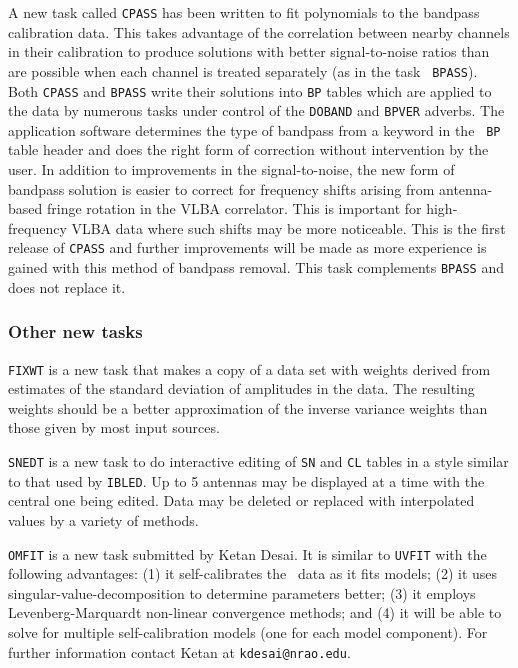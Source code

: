 A new task called {\tt CPASS} has been written to fit polynomials to
the bandpass calibration data.  This takes advantage of the
correlation between nearby channels in their calibration to produce
solutions with better signal-to-noise ratios than are possible when
each channel is treated separately (as in the task \hbox{{\tt
BPASS}}).  Both {\tt CPASS} and {\tt BPASS} write their solutions into
{\tt BP} tables which are applied to the data by numerous tasks under
control of the {\tt DOBAND} and {\tt BPVER} adverbs.  The application
software determines the type of bandpass from a keyword in the {\tt
BP} table header and does the right form of correction without
intervention by the user.  In addition to improvements in the
signal-to-noise, the new form of bandpass solution is easier to
correct for frequency shifts arising from antenna-based fringe
rotation in the VLBA correlator.  This is important for high-frequency
VLBA data where such shifts may be more noticeable.  This is the first
release of {\tt CPASS} and further improvements will be made as more
experience is gained with this method of bandpass removal. This task
complements {\tt BPASS} and does not replace it.

\subsubsection{Other new tasks}

{\tt FIXWT} is a new task that makes a copy of a data set with weights
derived from estimates of the standard deviation of amplitudes in the
data.  The resulting weights should be a better approximation of the
inverse variance weights than those given by most input sources.

{\tt SNEDT} is a new task to do interactive editing of {\tt SN} and
{\tt CL} tables in a style similar to that used by \hbox{{\tt IBLED}}.
Up to 5 antennas may be displayed at a time with the central one being
edited.  Data may be deleted or replaced with interpolated values
by a variety of methods.

{\tt OMFIT} is a new task submitted by Ketan Desai.  It is similar to
{\tt UVFIT} with the following advantages: (1) it self-calibrates the
\uv\ data as it fits models; (2) it uses singular-value-decomposition
to determine parameters better; (3) it employs Levenberg-Marquardt
non-linear convergence methods; and (4) it will be able to solve for
multiple self-calibration models (one for each model component).  For
further information contact Ketan at {\tt kdesai@nrao.edu}.


